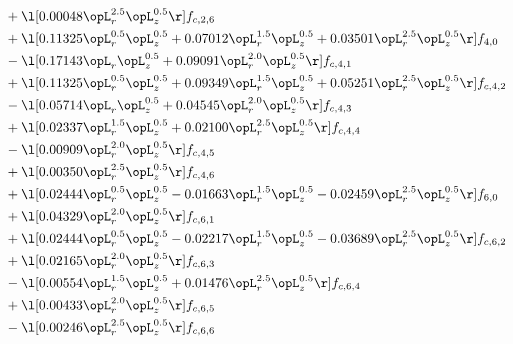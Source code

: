 \begin{alignat}{2}
& + \l[  0.00048 \opL_r^{2.5} \opL_z^{0.5}  \r] f_{c,2,6} \nonumber \\ 
& + \l[  0.11325 \opL_r^{0.5} \opL_z^{0.5} +  0.07012 \opL_r^{1.5} \opL_z^{0.5} +  0.03501 \opL_r^{2.5} \opL_z^{0.5}  \r] f_{4,0} \nonumber \\ 
& - \l[  0.17143 \opL_r \opL_z^{0.5} +  0.09091 \opL_r^{2.0} \opL_z^{0.5}  \r] f_{c,4,1} \nonumber \\ 
& + \l[  0.11325 \opL_r^{0.5} \opL_z^{0.5} +  0.09349 \opL_r^{1.5} \opL_z^{0.5} +  0.05251 \opL_r^{2.5} \opL_z^{0.5}  \r] f_{c,4,2} \nonumber \\ 
& - \l[  0.05714 \opL_r \opL_z^{0.5} +  0.04545 \opL_r^{2.0} \opL_z^{0.5}  \r] f_{c,4,3} \nonumber \\ 
& + \l[  0.02337 \opL_r^{1.5} \opL_z^{0.5} +  0.02100 \opL_r^{2.5} \opL_z^{0.5}  \r] f_{c,4,4} \nonumber \\ 
& - \l[  0.00909 \opL_r^{2.0} \opL_z^{0.5}  \r] f_{c,4,5} \nonumber \\ 
& + \l[  0.00350 \opL_r^{2.5} \opL_z^{0.5}  \r] f_{c,4,6} \nonumber \\ 
& + \l[  0.02444 \opL_r^{0.5} \opL_z^{0.5}   -0.01663 \opL_r^{1.5} \opL_z^{0.5}   -0.02459 \opL_r^{2.5} \opL_z^{0.5}  \r] f_{6,0} \nonumber \\ 
& + \l[  0.04329 \opL_r^{2.0} \opL_z^{0.5}  \r] f_{c,6,1} \nonumber \\ 
& + \l[  0.02444 \opL_r^{0.5} \opL_z^{0.5}   -0.02217 \opL_r^{1.5} \opL_z^{0.5}   -0.03689 \opL_r^{2.5} \opL_z^{0.5}  \r] f_{c,6,2} \nonumber \\ 
& + \l[  0.02165 \opL_r^{2.0} \opL_z^{0.5}  \r] f_{c,6,3} \nonumber \\ 
& - \l[  0.00554 \opL_r^{1.5} \opL_z^{0.5} +  0.01476 \opL_r^{2.5} \opL_z^{0.5}  \r] f_{c,6,4} \nonumber \\ 
& + \l[  0.00433 \opL_r^{2.0} \opL_z^{0.5}  \r] f_{c,6,5} \nonumber \\ 
& - \l[  0.00246 \opL_r^{2.5} \opL_z^{0.5}  \r] f_{c,6,6} \nonumber \\ 
\end{alignat} 


